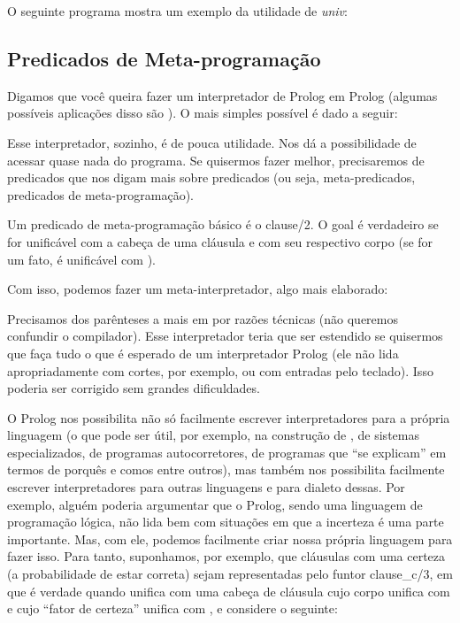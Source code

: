 \documentclass{article}
\begin{document}
O seguinte programa mostra um exemplo da utilidade de \textit{univ}:



\subsection{Predicados de Meta-programação}

Digamos que você queira fazer um interpretador de Prolog em Prolog (algumas possíveis aplicações disso são ). O mais simples possível é dado a seguir:


Esse interpretador, sozinho, é de pouca utilidade. Nos dá a possibilidade de acessar quase nada do programa. Se quisermos fazer
melhor, precisaremos de predicados que nos digam mais sobre predicados (ou seja, meta-predicados, predicados de meta-programação).

Um predicado de meta-programação básico é o clause/2. O goal  é verdadeiro se  for unificável
com a cabeça de uma cláusula e  com seu respectivo corpo (se  for um fato,  é unificável com ).

Com isso, podemos fazer um meta-interpretador, algo mais elaborado:



Precisamos dos parênteses a mais em  por razões técnicas (não queremos confundir o compilador). Esse
interpretador teria que ser estendido se quisermos que faça tudo o que é esperado de um interpretador Prolog (ele não lida
apropriadamente com cortes, por exemplo, ou com entradas pelo teclado). Isso poderia ser corrigido sem grandes dificuldades.

O Prolog nos possibilita não só facilmente escrever interpretadores para a própria linguagem (o que pode ser útil, por exemplo, na construção de , de sistemas especializados, de programas autocorretores, de programas que ``se explicam'' em termos
de porquês e comos entre outros), mas também nos possibilita facilmente escrever interpretadores para outras linguagens e para
dialeto dessas. Por exemplo, alguém poderia argumentar que o Prolog, sendo uma linguagem de programação lógica, não lida bem
com situações em que a incerteza é uma parte importante. Mas, com ele, podemos facilmente criar nossa própria linguagem
para fazer isso. Para tanto, suponhamos, por exemplo, que cláusulas com uma certeza (a probabilidade de estar correta)  sejam representadas pelo funtor clause\_c/3, em que  é verdade quando  unifica com uma cabeça de cláusula cujo corpo unifica com  e cujo ``fator de certeza''  unifica com , e considere o seguinte:
\end{document}
